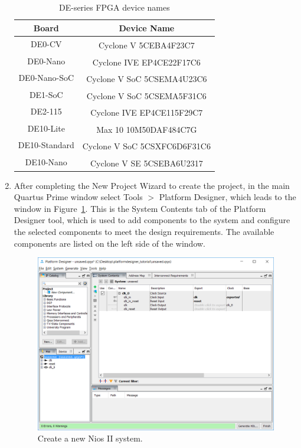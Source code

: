 \documentclass[11pt, twoside, pdftex]{article}
\begin{document}
\begin{enumerate}
\begin{table}[H]
	\begin{center}
	\begin{tabular}{| c | c |}
	\hline
	Board & Device Name \\
	\hline
	DE0-CV & Cyclone\textsuperscript{\textregistered} V 5CEBA4F23C7 \\
	\hline
	DE0-Nano & Cyclone\textsuperscript{\textregistered} IVE EP4CE22F17C6 \\
	\hline
	DE0-Nano-SoC & Cyclone\textsuperscript{\textregistered} V SoC 5CSEMA4U23C6\\
	\hline
	DE1-SoC & Cyclone\textsuperscript{\textregistered} V SoC 5CSEMA5F31C6 \\
	\hline
	DE2-115 & Cyclone\textsuperscript{\textregistered} IVE EP4CE115F29C7 \\
	\hline
	DE10-Lite & Max\textsuperscript{\textregistered} 10 10M50DAF484C7G \\
	\hline
	DE10-Standard & Cyclone\textsuperscript{\textregistered} V SoC 5CSXFC6D6F31C6 \\
	\hline
	DE10-Nano & Cyclone\textsuperscript{\textregistered} V SE 5CSEBA6U2317 \\
	\hline
	\end{tabular}
	\caption{DE-series FPGA device names}
	\label{tab:device}
	\end{center}
\end{table}

\item After completing the New Project Wizard to create the project,
in the main Quartus Prime window select {\sf Tools $>$ Platform Designer}, which leads to 
the window in Figure~\ref{fig:4}.
This is the System Contents tab of the Platform Designer tool, which is used to
add components to the system and configure the selected components to meet the design
requirements. The available components are listed on the left side of the window.


\begin{figure}[H]
   \begin{center}
      \includegraphics[scale=0.55]{figures/figure4.png}
   \end{center}
   \caption{Create a new Nios II system.} 
	\label{fig:4}
\end{figure}


\end{enumerate}
\end{document}
